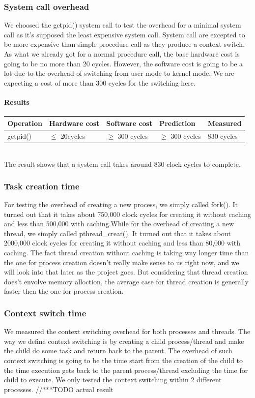 \subsubsection{System call overhead}
We choosed the getpid() system call to test the overhead for a minimal system
call as it's supposed the least expensive system call.
System call are excepted to be more expensive than simple procedure call as they
produce a context switch. As what we already got for a normal procedure call, the base hardware cost is going to be no more than 20 cycles. However, the software cost is going to be a lot due to the overhead of switching from user mode to kernel mode. We are expecting a cost of more than 300 cycles for the switching here.

\paragraph{Results}
\begin{tabular}{| l | l | l | l | l |}
\hline
Operation & Hardware cost & Software cost & Prediction & Measured \\ \hline
getpid()  & $\le$ 20cycles  & $\ge$ 300 cycles  & $\ge$ 300 cycles & 830 cycles \\ \hline
\end{tabular} \\
The result shows that a system call takes around 830 clock cycles to complete.

\subsubsection{Task creation time}
For testing the overhead of creating a new process, we simply called fork(). It turned out that it takes about 750,000 clock cycles for creating it without caching and less than 500,000 with caching.While for the overhead of creating a new thread, we simply called pthread\_creat(). It turned out that it takes about 2000,000 clock cycles for creating it without caching and less than 80,000 with caching.
The fact thread creation without caching is taking way longer time than the one for process creation doesn't really make sense to us right now, and we will look into that later as the project goes. But considering that thread creation does't envolve memory alloction, the average case for thread creation is generally faster then the one for process creation.


\subsubsection{Context switch time}
We measured the context switching overhead for both processes and threads. The way we define context switching is by creating a child process/thread and make the child do some task and return back to the parent. The overhead of such context switching is going to be the time start from the creation of the child to the time execution gets back to the parent process/thread excluding the time for child to execute. We only tested the context switching within 2 different processes.
//***TODO actual result



